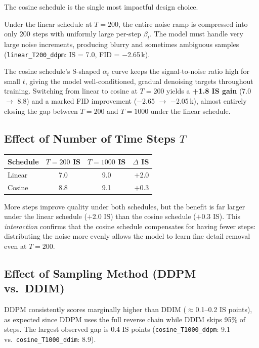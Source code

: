 \documentclass[11pt,a4paper]{article}
\begin{document}
The cosine schedule is the single most impactful design choice.

Under the linear schedule at $T=200$, the entire noise ramp is compressed into
only 200 steps with uniformly large per-step $\beta_t$.  The model must handle
very large noise increments, producing blurry and sometimes ambiguous samples
(\texttt{linear\_T200\_ddpm}: IS = 7.0, FID = $-$2.65\,k).

The cosine schedule's S-shaped $\bar\alpha_t$ curve keeps the signal-to-noise
ratio high for small $t$, giving the model well-conditioned, gradual denoising
targets throughout training.  Switching from linear to cosine at $T=200$
yields a \textbf{+1.8 IS gain} (7.0 $\to$ 8.8) and a marked FID improvement
($-$2.65 $\to$ $-$2.05\,k), almost entirely closing the gap between
$T=200$ and $T=1000$ under the linear schedule.

\subsection{Effect of Number of Time Steps \boldmath$T$}

\begin{center}
\begin{tabular}{lcc r}
\toprule
\textbf{Schedule} & \boldmath$T=200$ IS & \boldmath$T=1000$ IS & \boldmath$\Delta$ IS\\
\midrule
Linear & 7.0 & 9.0 & $+$2.0\\
Cosine & 8.8 & 9.1 & $+$0.3\\
\bottomrule
\end{tabular}
\end{center}

More steps improve quality under both schedules, but the benefit is far
larger under the linear schedule ($+$2.0 IS) than the cosine schedule
($+$0.3 IS).  This \emph{interaction} confirms that the cosine schedule
compensates for having fewer steps: distributing the noise more evenly
allows the model to learn fine detail removal even at $T=200$.

\subsection{Effect of Sampling Method (DDPM vs.\ DDIM)}

DDPM consistently scores marginally higher than DDIM ($\approx$0.1–0.2 IS
points), as expected since DDPM uses the full reverse chain while DDIM skips
95\% of steps. The largest observed gap is 0.4 IS points
(\texttt{cosine\_T1000\_ddpm}: 9.1 vs.\ \texttt{cosine\_T1000\_ddim}: 8.9).
\end{document}
